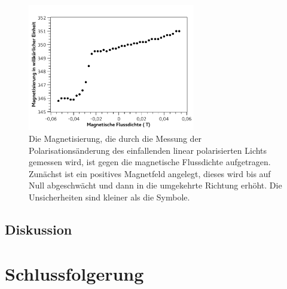 \documentclass[
	a4paper,
	12pt,
	pagesize,
	ngerman
]{scrartcl}
\begin{document}
	\begin{figure}[H] %
		\includegraphics[width=0.65\textwidth]{fig_magn2}
		\centering
		\caption{Die Magnetisierung, die durch die Messung der Polarisationsänderung des einfallenden linear polarisierten Lichts gemessen wird, ist gegen die magnetische Flussdichte aufgetragen. 
		Zunächst ist ein positives Magnetfeld angelegt, dieses wird bis auf Null abgeschwächt und dann in die umgekehrte Richtung erhöht.
		Die Unsicherheiten sind kleiner als die Symbole.} 
		\label{fig_magn2}
		\centering
	\end{figure}
	\subsection{Diskussion}

	
	\section{Schlussfolgerung}
	
\end{document}
